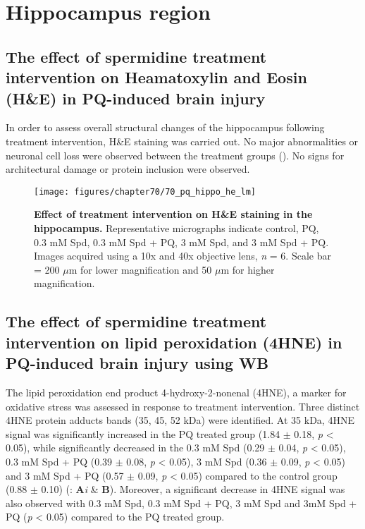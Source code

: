 \section{Hippocampus region}
\subsection{The effect of spermidine treatment intervention on Heamatoxylin and Eosin (H\&E) in PQ-induced brain injury}
In order to assess overall structural changes of the hippocampus following treatment intervention, H\&E staining was carried out. No major abnormalities or neuronal cell loss were observed between the treatment groups (). No signs for architectural damage or protein inclusion were observed.

\begin{figure}[!htbp]
\center
  \texttt{[image: figures/chapter70/70\_pq\_hippo\_he\_lm]}
  \caption[Effect of treatment intervention on H\&E staining in the hippocampus]{\textbf{Effect of treatment intervention on H\&E staining in the hippocampus.} Representative micrographs indicate control, PQ, 0.3 mM Spd, 0.3 mM Spd + PQ, 3 mM Spd, and 3 mM Spd + PQ. Images acquired using a 10x and 40x objective lens, \textit{n} = 6. Scale bar = 200 $\mu$m for lower magnification and 50 $\mu$m for higher magnification.}
  \label{fig:70_pq_hippo_he_lm}
\end{figure} 

\subsection{The effect of spermidine treatment intervention on lipid peroxidation (4HNE) in PQ-induced brain injury using WB}
The lipid peroxidation end product 4-hydroxy-2-nonenal (4HNE), a marker for oxidative stress was assessed in response to treatment intervention. Three distinct 4HNE protein adducts bands (35, 45, 52 kDa) were identified. At 35 kDa, 4HNE signal was significantly increased in the PQ treated group (1.84 $\pm$ 0.18, \textit{p} < 0.05), while significantly decreased in the 0.3 mM Spd (0.29 $\pm$ 0.04, \textit{p} < 0.05), 0.3 mM Spd + PQ (0.39 $\pm$ 0.08, \textit{p} < 0.05), 3 mM Spd (0.36 $\pm$ 0.09, \textit{p} < 0.05) and 3 mM Spd + PQ (0.57 $\pm$ 0.09, \textit{p} < 0.05) compared to the control group (0.88 $\pm$ 0.10) (: \textbf{A}\textit{i} \& \textbf{B}). Moreover, a significant decrease in 4HNE signal was also observed with 0.3 mM Spd, 0.3 mM Spd + PQ, 3 mM Spd and 3mM Spd + PQ (\textit{p} < 0.05) compared to the PQ treated group. 

